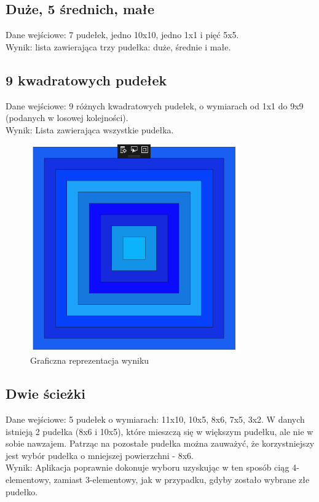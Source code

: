 \documentclass{article}
\begin{document}
\subsection{Duże, 5 średnich, małe}
Dane wejściowe: 7 pudełek, jedno 10x10, jedno 1x1 i pięć 5x5. \\
Wynik: lista zawierająca trzy pudełka: duże, średnie i małe.

\subsection{9 kwadratowych pudełek}
Dane wejściowe: 9 różnych kwadratowych pudełek, o wymiarach od 1x1 do 9x9 (podanych w losowej kolejności).  \\
Wynik: Lista zawierająca wszystkie pudełka.
\begin{figure}[H]
\centering
\includegraphics[width=0.8\textwidth]{square_boxes_res.png}
\caption{Graficzna reprezentacja wyniku}
\end{figure}

\subsection{Dwie ścieżki}
Dane wejściowe: 5 pudełek o wymiarach: 11x10, 10x5, 8x6, 7x5, 3x2. W danych istnieją 2 pudełka (8x6 i 10x5), które mieszczą się w większym pudełku, ale nie w sobie nawzajem. Patrząc na pozostałe pudełka można zauważyć, że korzystniejszy jest wybór pudełka o mniejszej powierzchni - 8x6.\\
Wynik: Aplikacja poprawnie dokonuje wyboru uzyskując w ten sposób ciąg 4-elementowy, zamiast 3-elementowy, jak w przypadku, gdyby zostało wybrane złe pudełko.
\end{document}
